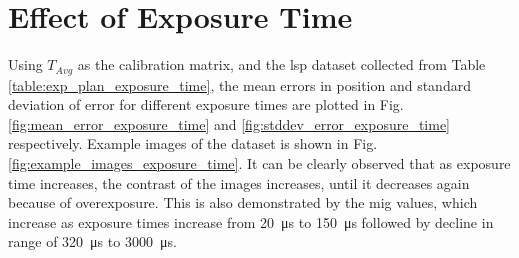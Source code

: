 


\clearpage

\section{Effect of Exposure Time} \label{section:effect_of_exp_time}
Using $T_{Avg}$ as the calibration matrix, and the \gls{lsp} dataset collected from Table \ref{table:exp_plan_exposure_time}, the mean errors in position and standard deviation of error for different exposure times are plotted in Fig. \ref{fig:mean_error_exposure_time} and \ref{fig:stddev_error_exposure_time} respectively. Example images of the dataset is shown in Fig. \ref{fig:example_images_exposure_time}. It can be clearly observed that as exposure time increases, the contrast of the images increases, until it decreases again because of overexposure. This is also demonstrated by the \gls{mig} values, which increase as exposure times increase from \SI{20}{\micro\second} to \SI{150}{\micro\second} followed by decline in range of \SI{320}{\micro\second} to \SI{3000}{\micro\second}. 

